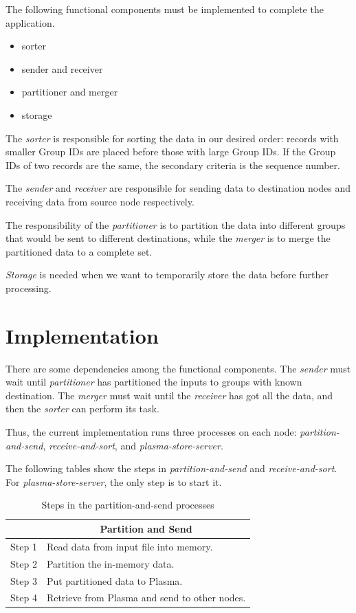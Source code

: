 \documentclass{article}
\begin{document}
The following functional components must be implemented to complete the application.
\begin{itemize}
    \item sorter
    \item sender and receiver
    \item partitioner and merger
    \item storage
\end{itemize}

The \textit{sorter} is responsible for sorting the data in our desired order: records with smaller Group IDs are placed before those with large Group IDs.
If the Group IDs of two records are the same, the secondary criteria is the sequence number.

The \textit{sender} and \textit{receiver} are responsible for sending data to destination nodes and receiving data from source node respectively.

The responsibility of the \textit{partitioner} is to partition the data into different groups that would be sent to different destinations,
while the \textit{merger} is to merge the partitioned data to a complete set.

\textit{Storage} is needed when we want to temporarily store the data before further processing.

\section{Implementation}
There are some dependencies among the functional components.
The \textit{sender} must wait until \textit{partitioner} has partitioned the inputs to groups with known destination.
The \textit{merger} must wait until the \textit{receiver} has got all the data, and then the \textit{sorter} can perform its task.

Thus, the current implementation runs three processes on each node:
\textit{partition-and-send},
\textit{receive-and-sort}, and
\textit{plasma-store-server}.

The following tables show the steps in \textit{partition-and-send} and \textit{receive-and-sort}.
For \textit{plasma-store-server}, the only step is to start it.

\begin{table}[h!]
    \centering
    \begin{tabular}{|l|l|}
    \hline
           & \multicolumn{1}{c|}{\textbf{Partition and Send}} \\ \hline
    Step 1 & Read data from input file into memory.           \\ \hline
    Step 2 & Partition the in-memory data.                    \\ \hline
    Step 3 & Put partitioned data to Plasma.                  \\ \hline
    Step 4 & Retrieve from Plasma and send to other nodes.    \\ \hline
    \end{tabular}
    \caption{Steps in the partition-and-send processes}
\end{table}
\end{document}
